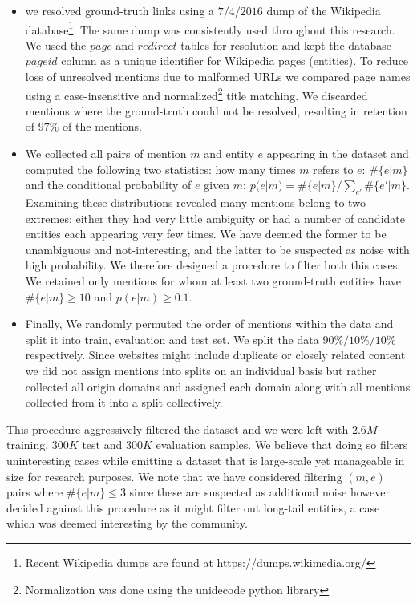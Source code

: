 \documentclass[11pt]{article}
\begin{document}
\begin{itemize} 
	\item we resolved ground-truth links using a $7/4/2016$ dump of the Wikipedia database\footnote{Recent Wikipedia dumps are found at https://dumps.wikimedia.org/}. The same dump was consistently used throughout this research. We used the $page$ and $redirect$ tables for resolution and kept the database $pageid$ column as a unique identifier for Wikipedia pages (entities). To reduce loss of unresolved mentions due to malformed URLs we compared page names using a case-insensitive and normalized\footnote{Normalization was done using the unidecode python library} title matching. We discarded mentions where the ground-truth could not be resolved, resulting in retention of $97\%$ of the mentions.
	\item We collected all pairs of mention $m$ and entity $e$ appearing in the dataset and computed the following two statistics: how many times $m$ refers to $e$: $\#\{e|m\}$ and the conditional probability of $e$ given $m$: $p(e|m)=\#\{e|m\}/\sum_{e'}\#\{e'|m\}$. Examining these distributions revealed many mentions belong to two extremes: either they had very little ambiguity or had a number of candidate entities each appearing very few times. We have deemed the former to be unambiguous and not-interesting, and the latter to be suspected as noise with high probability. We therefore designed a procedure to filter both this cases: We retained only mentions for whom at least two ground-truth entities have $\#\{e|m\}\ge 10$ and $p(e|m)\ge0.1$. 
	\item Finally, We randomly permuted the order of mentions within the data and split it into train, evaluation and test set. We split the data $90\% / 10\% / 10\%$ respectively. Since websites might include duplicate or closely related content we did not assign mentions into splits on an individual basis but rather collected all origin domains and assigned each domain along with all mentions collected from it into a split collectively.
\end{itemize}

This procedure aggressively filtered the dataset and we were left with $2.6M$ training, $300K$ test and $300K$ evaluation samples. We believe that doing so filters uninteresting cases while emitting a dataset that is large-scale yet manageable in size for research purposes. We note that we have considered filtering $(m,e)$ pairs where $\#\{e|m\}\le 3$ since these are suspected as additional noise however decided against this procedure as it might filter out long-tail entities, a case which was deemed interesting by the community.
\end{document}
